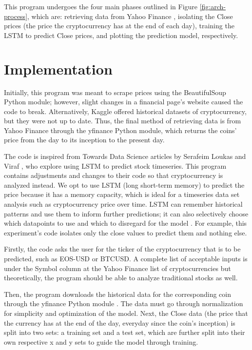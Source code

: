 This program undergoes the four main phases outlined in Figure
\ref{fig:arch-process}, which are: retrieving data from Yahoo Finance
\cite{c4}, isolating the Close prices (the price the cryptocurrency
has at the end of each day), training the LSTM to predict Close
prices, and plotting the prediction model, respectively.

\section{Implementation}

Initially, this program was meant to scrape prices using the
BeautifulSoup Python module; however, slight changes in a financial
page's website caused the code to break. Alternatively, Kaggle offered
historical datasets of cryptocurrency, but they were not up to
date. Thus, the final method of retrieving data is from Yahoo Finance
through the yfinance Python module, which returns the coins' price
from the day to its inception to the present day.

The code is inspired from Towards Data Science articles by Serafeim
Loukas \cite{c7} and Viraf \cite{c11}, who explore using LSTM to
predict stock timeseries. This program contains adjustments and
changes to their code so that cryptocurrency is analyzed instead. We
opt to use LSTM (long short-term memory) to predict the price because
it has a memory capacity, which is ideal for a timeseries data set
analysis such as cryptocurrency price over time. LSTM can remember
historical patterns and use them to inform further predictions; it can
also selectively choose which datapoints to use and which to disregard
for the model \cite{c8}. For example, this experiment's code isolates
only the close values to predict them and nothing else.

Firstly, the code asks the user for the ticker of the cryptocurrency
that is to be predicted, such as EOS-USD or BTCUSD. A complete list of
acceptable inputs is under the Symbol column at the Yahoo Finance list
of cryptocurrencies \cite{c17} but theoretically, the program should
be able to analyze traditional stocks as well.

Then, the program downloads the historical data for the corresponding
coin through the yfinance Python module \cite{c18}. The data must go
through normalization for simplicity and optimization of the
model. Next, the Close data (the price that the currency has at the
end of the day, everyday since the coin's inception) is split into two
sets: a training set and a test set, which are further split into
their own respective x and y sets to guide the model through training.

